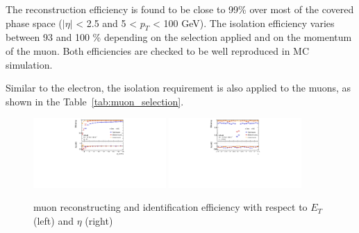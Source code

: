 The reconstruction efficiency is found to be close to 99\% over most of the covered phase space ($|\eta|$ < 2.5 and 5 < $p_{T}$ < 100 GeV). 
The isolation efficiency varies between 93 and 100 \% depending on the selection applied and on the momentum of the muon. 
Both efficiencies are checked to be well reproduced in MC simulation. 
\begin{table}[ht]
\centering
{}
 \caption{Summary of muon selection used in this analysis}
 \label{tab:muon_selection}
\end{table}
Similar to the electron, the isolation requirement is also applied to the muons, as shown in the Table~\ref{tab:muon_selection}.
\begin{figure}[tbp]
\begin{center}
 \includegraphics[width=0.45\textwidth,keepaspectratio]{figures/Reconstruction/recoMuonpT}
 \includegraphics[width=0.45\textwidth,keepaspectratio]{figures/Reconstruction/recoMuonEta}
\caption{
muon reconstructing and identification efficiency with respect to $E_T$ (left) and $\eta$ (right) \cite{MUON-2018-03}
}
\label{fig:recoMuon}
\end{center}
\end{figure}

